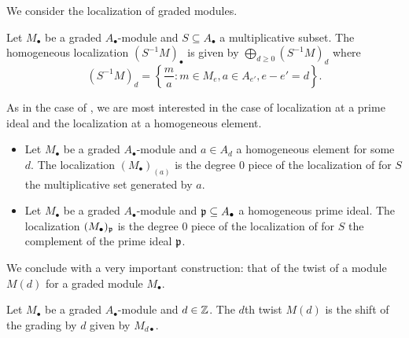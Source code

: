 We consider the localization of graded modules. 
\begin{definition}\label{def: homogeneous localization of modules}
    Let $M_{\bullet}$ be a graded $A_{\bullet}$-module and $S\subseteq A_{\bullet}$ a multiplicative subset. The homogeneous localization $(S^{-1}M)_{\bullet}$ is given by $\bigoplus_{d\geq0}(S^{-1}M)_{d}$ where 
    $$(S^{-1}M)_{d}=\left\{\frac{m}{a}:m\in M_{e},a\in A_{e'}, e-e'=d\right\}.$$
\end{definition}
As in the case of , we are most interested in the case of localization at a prime ideal and the localization at a homogeneous element. 
\begin{itemize}
    \item Let $M_{\bullet}$ be a graded $A_{\bullet}$-module and $a\in A_{d}$ a homogeneous element for some $d$. The localization $(M_{\bullet})_{(a)}$ is the degree 0 piece of the localization of  for $S$ the multiplicative set generated by $a$. 
    \item Let $M_{\bullet}$ be a graded $A_{\bullet}$-module and $\mathfrak{p}\subseteq A_{\bullet}$ a homogeneous prime ideal. The localization $(M_{\bullet})_{\mathfrak{p}}$ is the degree 0 piece of the localization of  for $S$ the complement of the prime ideal $\mathfrak{p}$. 
\end{itemize}
We conclude with a very important construction: that of the twist of a module $M(d)$ for a graded module $M_{\bullet}$. 
\begin{definition}\label{def: twist of graded module}
    Let $M_{\bullet}$ be a graded $A_{\bullet}$-module and $d\in\mathbb{Z}$. The $d$th twist $M(d)$ is the shift of the grading by $d$ given by $M_{d\bullet}$. 
\end{definition}